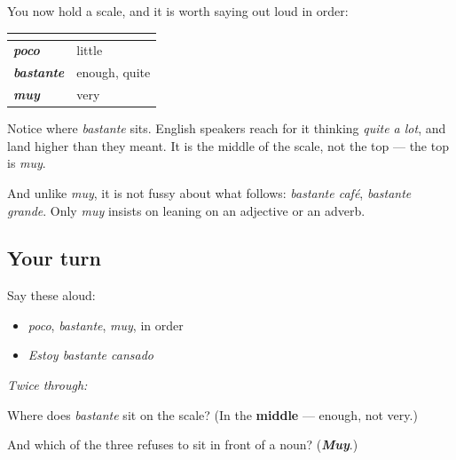 \begin{culture}
You now hold a scale, and it is worth saying out loud in order:

\noindent
\begin{tabularx}{\linewidth}{@{}>{\raggedright\arraybackslash}X>{\raggedright\arraybackslash}X@{}}
\toprule
\textbf{} & \textbf{} \\
\midrule
\emph{\textbf{poco}} & little \\
\emph{\textbf{bastante}} & enough, quite \\
\emph{\textbf{muy}} & very \\
\bottomrule
\end{tabularx}

Notice where \emph{bastante} sits. English speakers reach for it thinking \emph{quite a lot}, and land higher than they meant. It is the middle of the scale, not the top — the top is \emph{muy}.

And unlike \emph{muy}, it is not fussy about what follows: \emph{bastante café}, \emph{bastante grande}. Only \emph{muy} insists on leaning on an adjective or an adverb.
\end{culture}

\subsection*{Your turn}
Say these aloud:

\begin{itemize}
\raggedright
  \item \emph{poco}, \emph{bastante}, \emph{muy}, in order
  \item \emph{Estoy bastante cansado}
\end{itemize}

\emph{Twice through:}

\begin{tcolorbox}[breakable,colback=teal!4,colframe=teal!35!black,title={Before you move on}]
Where does \emph{bastante} sit on the scale? (In the \textbf{middle} — enough, not very.)

And which of the three refuses to sit in front of a noun? (\emph{\textbf{Muy}}.)
\end{tcolorbox}
